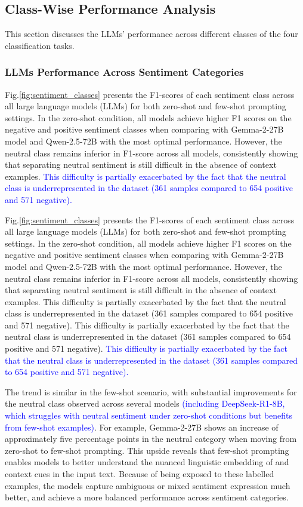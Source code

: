 \documentclass[10pt,letterpaper]{article}
\newcommand{\rev}[1]{\textcolor{blue}{#1}}
\begin{document}
\subsection*{Class-Wise Performance Analysis}

This section discusses the LLMs' performance across different classes of the four classification tasks.

\subsubsection*{LLMs Performance Across Sentiment Categories}
\label{sec:sentiment_classes}

Fig.\ref{fig:sentiment_classes} presents the F1-scores of each sentiment class across all large language models (LLMs) for both zero-shot and few-shot prompting settings. In the zero-shot condition, all models achieve higher F1 scores on the negative and positive sentiment classes when comparing with Gemma-2-27B model and Qwen-2.5-72B with the most optimal performance. However, the neutral class remains inferior in F1-score across all models, consistently showing that separating neutral sentiment is still difficult in the absence of context examples. \rev{This difficulty is partially exacerbated by the fact that the neutral class is underrepresented in the dataset (361 samples compared to 654 positive and 571 negative).}

Fig.\ref{fig:sentiment_classes} presents the F1-scores of each sentiment class across all large language models (LLMs) for both zero-shot and few-shot prompting settings. In the zero-shot condition, all models achieve higher F1 scores on the negative and positive sentiment classes when comparing with Gemma-2-27B model and Qwen-2.5-72B with the most optimal performance. However, the neutral class remains inferior in F1-score across all models, consistently showing that separating neutral sentiment is still difficult in the absence of context examples. This difficulty is partially exacerbated by the fact that the neutral class is underrepresented in the dataset (361 samples compared to 654 positive and 571 negative). This difficulty is partially exacerbated by the fact that the neutral class is underrepresented in the dataset (361 samples compared to 654 positive and 571 negative). \rev{This difficulty is partially exacerbated by the fact that the neutral class is underrepresented in the dataset (361 samples compared to 654 positive and 571 negative).}

The trend is similar in the few-shot scenario, with substantial improvements for the neutral class observed across several models \rev{(including DeepSeek-R1-8B, which struggles with neutral sentiment under zero-shot conditions but benefits from few-shot examples)}. For example, Gemma-2-27B shows an increase of approximately five percentage points in the neutral category when moving from zero-shot to few-shot prompting. This upside reveals that few-shot prompting enables models to better understand the nuanced linguistic embedding of and context cues in the input text. Because of being exposed to these labelled examples, the models capture ambiguous or mixed sentiment expression much better, and achieve a more balanced performance across sentiment categories.
\end{document}
